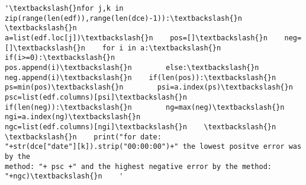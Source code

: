 \documentclass[11pt]{article}
\makeatletter
\newcommand{\boxspacing}{\kern\kvtcb@left@rule\kern\kvtcb@boxsep}
\newcommand{\prompt}[4]{
        \ttfamily\llap{{\color{#2}[#3]:\hspace{3pt}#4}}\vspace{-\baselineskip}
    }
\makeatother
\begin{document}
            \begin{tcolorbox}[breakable, size=fbox, boxrule=.5pt, pad at break*=1mm, opacityfill=0]
\prompt{Out}{outcolor}{30}{\boxspacing}
\begin{Verbatim}[commandchars=\\\{\}]
'\textbackslash{}nfor j,k in zip(range(len(edf)),range(len(dce)-1)):\textbackslash{}n    \textbackslash{}n
a=list(edf.loc[j])\textbackslash{}n    pos=[]\textbackslash{}n    neg=[]\textbackslash{}n    for i in a:\textbackslash{}n        if(i>=0):\textbackslash{}n
pos.append(i)\textbackslash{}n        else:\textbackslash{}n            neg.append(i)\textbackslash{}n    if(len(pos)):\textbackslash{}n
ps=min(pos)\textbackslash{}n        psi=a.index(ps)\textbackslash{}n        psc=list(edf.columns)[psi]\textbackslash{}n
if(len(neg)):\textbackslash{}n        ng=max(neg)\textbackslash{}n        ngi=a.index(ng)\textbackslash{}n
ngc=list(edf.columns)[ngi]\textbackslash{}n    \textbackslash{}n    \textbackslash{}n    print("for date:
"+str(dce["date"][k]).strip("00:00:00")+" the lowest positve error was by the
method: "+ psc +" and the highest negative error by the method: "+ngc)\textbackslash{}n    '
\end{Verbatim}
\end{tcolorbox}
        
\end{document}
